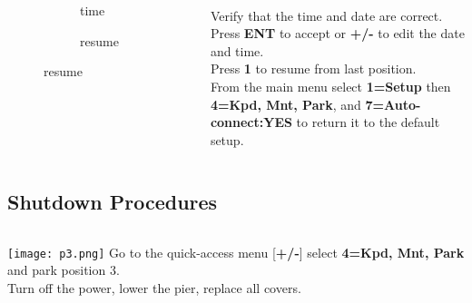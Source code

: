 \begin{frame}[t]{\insertsubsectionhead}
    \begin{columns}[T]

      \begin{figure}[ht]
          \begin{subfigure}{0.67\textwidth}
          \caption{time}
        \end{subfigure}
        \vspace{\fill}
        \begin{subfigure}{0.67\textwidth}
          \caption{resume}
        \end{subfigure}
      \end{figure}
    \ \\[0.25ex]
    Verify that the time and date are correct.\\[1ex]

    Press \textbf{ENT} to accept or \textbf{+/-} to edit the date and
    time.\\[1ex]

    Press \textbf{1} to resume from last position.\\[1ex]

    From the main menu select \textbf{1=Setup} then \textbf{4=Kpd, Mnt, Park},
    and \textbf{7=Auto-connect:YES} to return it to the default setup.

  \end{columns}
\end{frame}


\subsection{Shutdown Procedures}

\begin{frame}[t]{\insertsubsectionhead}
  \begin{columns}[T]
      \centering
      \texttt{[image: p3.png]}
    Go to the quick-access menu [\textbf{+/-}] select \textbf{4=Kpd, Mnt,
    Park} and park position 3.\\[1ex]

    Turn off the power, lower the pier, replace all covers.

  \end{columns}
\end{frame}

